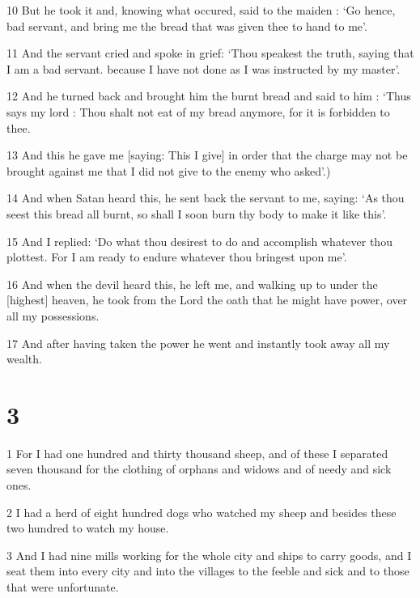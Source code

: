 \par 10 But he took it and, knowing what occured, said to the maiden : ‘Go hence, bad servant, and bring me the bread that was given thee to hand to me’.

\par 11 And the servant cried and spoke in grief: ‘Thou speakest the truth, saying that I am a bad servant. because I have not done as I was instructed by my master’.

\par 12 And he turned back and brought him the burnt bread and said to him : ‘Thus says my lord : Thou shalt not eat of my bread anymore, for it is forbidden to thee.

\par 13 And this he gave me [saying: This I give] in order that the charge may not be brought against me that I did not give to the enemy who asked’.)

\par 14 And when Satan heard this, he sent back the servant to me, saying: ‘As thou seest this bread all burnt, so shall I soon burn thy body to make it like this’.

\par 15 And I replied: ‘Do what thou desirest to do and accomplish whatever thou plottest. For I am ready to endure whatever thou bringest upon me’.

\par 16 And when the devil heard this, he left me, and walking up to under the [highest] heaven, he took from the Lord the oath that he might have power, over all my possessions.

\par 17 And after having taken the power he went and instantly took away all my wealth.

\chapter{3}

\par 1 For I had one hundred and thirty thousand sheep, and of these I separated seven thousand for the clothing of orphans and widows and of needy and sick ones.

\par 2 I had a herd of eight hundred dogs who watched my sheep and besides these two hundred to watch my house.

\par 3 And I had nine mills working for the whole city and ships to carry goods, and I seat them into every city and into the villages to the feeble and sick and to those that were unfortunate.

